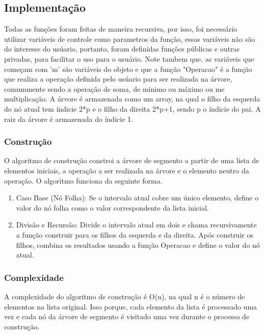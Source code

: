 \documentclass{article}
\begin{document}
\subsection{Implementação}
Todas as funções foram feitas de maneira recursiva, por isso, foi necessário utilizar variáveis de controle como parametros da função,
essas variáveis não são do interesse do usúario, portanto, foram definidas funções públicas e outras privadas, para facilitar o uso para o usuário. 
Note tambem que, as variáveis 
que começam com 'm' são variáveis do objeto e que a função "Operacao" é a função que realiza a operação definida pelo usúario para ser realizada
na árvore, comummente sendo a operação de soma, de mínimo ou máximo ou me multiplicação. A árvore é armazenada como um array, na qual o filho da 
esquerda do nó atual tem índicie 2*p e o filho da direita 2*p+1, sendo p o índicie do pai. A raiz da árvore é armazenada do índicie 1.

\subsubsection{Construção}
O algoritmo de construção constroi a árvore de segmento a partir de uma lista de elementos iniciais, a operação a ser realizada na árvore e o elemento
neutro da operação.
O algoritmo funciona da seguinte forma.
\begin{enumerate}
  \item Caso Base (Nó Folha): Se o intervalo atual cobre um único elemento, define o valor do nó folha como o valor correspondente da lista inicial.
  \item Divisão e Recursão: Divide o intervalo atual em dois e chama recursivamente a função construir para os filhos da esquerda e da direita. Após construir os filhos, combina os resultados usando a função Operacao e define o valor do nó atual.
\end{enumerate}
\subsubsection{Complexidade}
A complexidade do algoritmo de construção é O(n), na qual n é o número de elementos na lista original.
Isso porque, cada elemento da lista é processado uma vez e cada nó da árvore de segmento é visitado uma vez durante o processo de construção.
\end{document}
